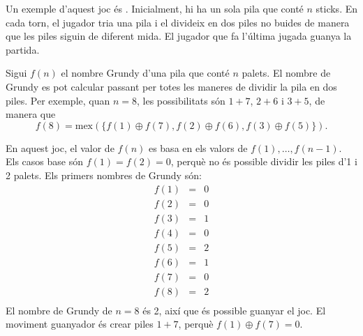 
Un exemple d'aquest joc és . Inicialment, hi ha
un sola pila que conté $n$ sticks. En cada torn, el jugador tria una
pila i el divideix en dos piles no buides de manera que les piles
siguin de diferent mida. El jugador que fa l'última jugada guanya la
partida.

Sigui $f(n)$ el nombre Grundy d'una pila que conté $n$ palets. El
nombre de Grundy es pot calcular passant per totes les maneres de dividir
la pila en dos piles. Per exemple, quan $n=8$, les possibilitats són
$1+7$, $2+6$ i $3+5$, de manera que
\[f(8)=\textrm{mex}(\{f(1) \oplus f(7), f(2) \oplus f(6), f(3) \oplus f(5)\}).\]


En aquest joc, el valor de $f(n)$ es basa en els valors de
$f(1),\ldots,f(n-1)$. Els casos base són $f(1)=f(2)=0$, perquè no és
possible dividir les piles d'1 i 2 palets. Els primers nombres de
Grundy són:
\[
\begin{array}{lcl}
f(1) & = & 0 \\
f(2) & = & 0 \\
f(3) & = & 1 \\
f(4) & = & 0 \\
f(5) & = & 2 \\
f(6) & = & 1 \\
f(7) & = & 0 \\
f(8) & = & 2 \\
\end{array}
\]
El nombre de Grundy de $n=8$ és 2, així que és possible guanyar el
joc. El moviment guanyador és crear piles $1+7$, perquè $f(1) \oplus
f(7) = 0$.
